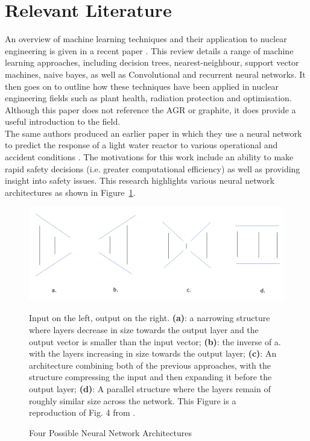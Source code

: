 \section{Relevant Literature}

An overview of machine learning techniques and their application to nuclear engineering is given in a recent paper \cite{gomez2020status}. This review details a range of machine learning approaches, including decision trees, nearest-neighbour, support vector machines, naive bayes, as well as Convolutional and recurrent neural networks. It then goes on to outline how these techniques have been applied in nuclear engineering fields such as plant health, radiation protection and optimisation. Although this paper does not reference the AGR or graphite, it does provide a useful introduction to the field. 
\\

\noindent
The same authors produced an earlier paper in which they use a neural network to predict the response of a light water reactor to various operational and accident conditions \cite{fernandez2017nuclear}. The motivations for this work include an ability to make rapid safety decisions (i.e. greater computational efficiency) as well as providing insight into safety issues. This research highlights various neural network architectures as shown in Figure~\ref{fig:architectures}.  
\\

\begin{figure}[p]
	\centering
	\includegraphics[scale=0.5]{Figures/architecture.png}
	\caption{Four Possible Neural Network Architectures} {Input on the left, output on the right. \textbf{(a)}: a narrowing structure where layers decrease in size towards the output layer and the output vector is smaller than the input vector; \textbf{(b)}: the inverse of a. with the layers increasing in size towards the output layer; \textbf{(c)}: An architecture combining both of the previous approaches, with the structure compressing the input and then expanding it before the output layer; \textbf{(d)}: A parallel structure where the layers remain of roughly similar size across the network. This Figure is a reproduction of Fig. 4 from \cite{fernandez2017nuclear}.}
	\label{fig:architectures}
\end{figure}

